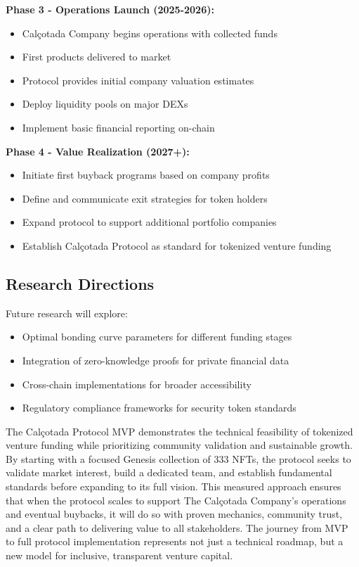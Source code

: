 \documentclass[conference]{IEEEtran}
\begin{document}
\textbf{Phase 3 - Operations Launch (2025-2026):}
\begin{itemize}
    \item Calçotada Company begins operations with collected funds
    \item First products delivered to market
    \item Protocol provides initial company valuation estimates
    \item Deploy liquidity pools on major DEXs
    \item Implement basic financial reporting on-chain
\end{itemize}

\textbf{Phase 4 - Value Realization (2027+):}
\begin{itemize}
    \item Initiate first buyback programs based on company profits
    \item Define and communicate exit strategies for token holders
    \item Expand protocol to support additional portfolio companies
    \item Establish Calçotada Protocol as standard for tokenized venture funding
\end{itemize}

\subsection{Research Directions}

Future research will explore:
\begin{itemize}
    \item Optimal bonding curve parameters for different funding stages
    \item Integration of zero-knowledge proofs for private financial data
    \item Cross-chain implementations for broader accessibility
    \item Regulatory compliance frameworks for security token standards
\end{itemize}

The Calçotada Protocol MVP demonstrates the technical feasibility of tokenized venture funding while prioritizing community validation and sustainable growth. By starting with a focused Genesis collection of 333 NFTs, the protocol seeks to validate market interest, build a dedicated team, and establish fundamental standards before expanding to its full vision. This measured approach ensures that when the protocol scales to support The Calçotada Company's operations and eventual buybacks, it will do so with proven mechanics, community trust, and a clear path to delivering value to all stakeholders. The journey from MVP to full protocol implementation represents not just a technical roadmap, but a new model for inclusive, transparent venture capital.
\end{document}
